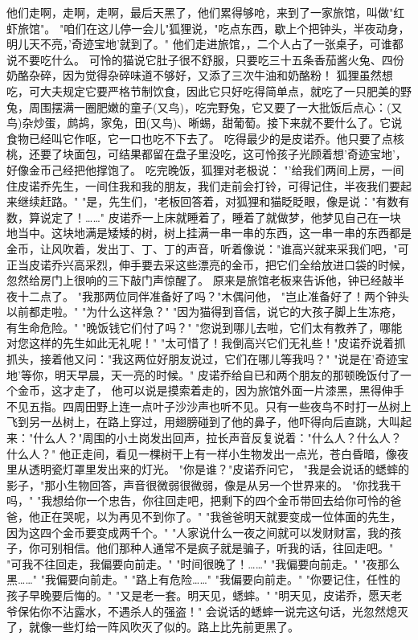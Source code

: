 \documentclass[12pt,UTF8]{ctexbook}
\begin{document}
他们走啊，走啊，走啊，最后天黑了，他们累得够呛，来到了一家旅馆，叫做"红虾旅馆"。
"咱们在这儿停一会儿"狐狸说，"吃点东西，歇上个把钟头，半夜动身，明儿天不亮，'奇迹宝地'就到了。"
他们走进旅馆，，二个人占了一张桌子，可谁都说不要吃什么。
可怜的猫说它肚子很不舒服，只要吃三十五条香茄酱火兔、四份奶酪杂碎，因为觉得杂碎味道不够好，又添了三次牛油和奶酪粉！
狐狸虽然想吃，可大夫规定它要严格节制饮食，因此它只好吃得简单点，就吃了一只肥美的野兔，周围摆满一圈肥嫩的童子(又鸟)，吃完野兔，它又要了一大批饭后点心：(又鸟)杂炒蛋，鹧鸪，家兔，田(又鸟)、晰蜴，甜葡萄。接下来就不要什么了。它说食物已经叫它作呕，它一口也吃不下去了。
吃得最少的是皮诺乔。他只要了点核桃，还要了块面包，可结果都留在盘子里没吃，这可怜孩子光顾着想'奇迹宝地'，好像金币己经把他撑饱了。
吃完晚饭，狐狸对老极说：
"'给我们两间上房，一间住皮诺乔先生，一间住我和我的朋友，我们走前会打铃，可得记住，半夜我们要起来继续赶路。"
"是，先生们，"老板回答着，对狐狸和猫眨眨眼，像是说："有数有数，算说定了！……"
皮诺乔一上床就睡着了，睡着了就做梦，他梦见自己在一块地当中。这块地满是矮矮的树，树上挂满一串一串的东西，这一串一串的东西都是金币，让风吹着，发出丁、丁、丁的声音，听着像说："谁高兴就来采我们吧，"可正当皮诺乔兴高采烈，伸手要去采这些漂亮的金币，把它们全给放进口袋的时候，忽然给房门上很响的三下敲门声惊醒了。
原来是旅馆老板来告诉他，钟已经敲半夜十二点了。
"我那两位同伴准备好了吗？"木偶问他，
"岂止准备好了！两个钟头以前都走啦。"
"为什么这祥急？"
"因为猫得到音信，说它的大孩子脚上生冻疮，有生命危险。"
"晚饭钱它们付了吗？"
"您说到哪儿去啦，它们太有教养了，哪能对您这样的先生如此无礼呢！"
"太可惜了！我倒高兴它们无礼些！"皮诺乔说着抓抓头，接着他又问："我这两位好朋友说过，它们在哪儿等我吗？"
"说是在'奇迹宝地'等你，明天早晨，天一亮的时候。"
皮诺乔给自已和两个朋友的那顿晚饭付了一个金币，这才走了，
他可以说是摸索着走的，因为旅馆外面一片漆黑，黑得伸手不见五指。四周田野上连一点叶子沙沙声也听不见。只有一些夜鸟不时打一丛树上飞到另一丛树上，在路上穿过，用翅膀碰到了他的鼻子，他吓得向后直跳，大叫起来："什么人？"周围的小土岗发出回声，拉长声音反复说着："什么人？什么人？什么人？"
他正走间，看见一棵树干上有一样小生物发出一点光，苍白昏暗，像夜里从透明瓷灯罩里发出来的灯光。
"你是谁？"皮诺乔问它，
"我是会说话的蟋蟀的影子，"那小生物回答，声音很微弱很微弱，像是从另一个世界来的。
"你找我干吗，"
"我想给你一个忠告，你往回走吧，把剩下的四个金币带回去给你可怜的爸爸，他正在哭呢，以为再见不到你了。"
"我爸爸明天就要变成一位体面的先生，因为这四个金币要变成两千个。"
"人家说什么一夜之间就可以发财财富，我的孩子，你可别相信。他们那种人通常不是疯子就是骗子，听我的话，往回走吧。"
"可我不往回走，我偏要向前走。"
"时间很晚了！……"
"我偏要向前走。"
"夜那么黑……"
"我偏要向前走。"
"路上有危险……"
"我偏要向前走。"
"你要记住，任性的孩子早晚要后悔的。"
"又是老一套。明天见，蟋蟀。"
"明天见，皮诺乔，愿天老爷保佑你不沾露水，不遇杀人的强盗！"
会说话的蟋蟀一说完这句话，光忽然熄灭了，就像一些灯给一阵风吹灭了似的。路上比先前更黑了。
\end{document}
